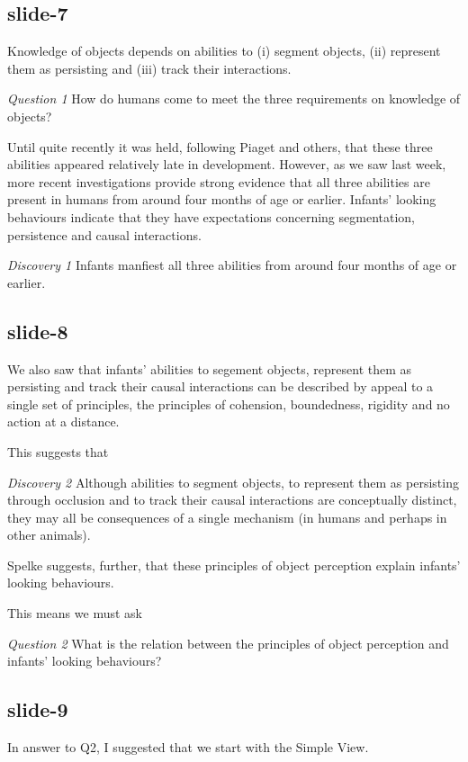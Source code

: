 \documentclass[12pt,\papersize]{extarticle}
\begin{document}
\subsection{slide-7}
Knowledge of objects depends on abilities to (i) segment objects, (ii) represent them as 
persisting and (iii) track their interactions.
 
\emph{Question 1}  How do humans come to meet the three requirements on knowledge of objects?
 
Until quite recently it was held, following Piaget and others, that these three abilities 
appeared relatively late in development.  
However, as we saw last week, more recent investigations provide strong evidence that all three 
abilities are present in humans from around four months of age or earlier.  
Infants' looking behaviours indicate that they have expectations concerning segmentation, 
persistence and causal interactions.
 
\emph{Discovery 1} Infants manfiest all three abilities from around four months of age or 
earlier.
 
\subsection{slide-8}
We also saw that infants' abilities to segement objects, represent them as persisting and track 
their causal interactions can be described by appeal to a single set of principles, 
the principles of cohension, boundedness, rigidity and no action at a distance.
 
This suggests that 
          
\emph{Discovery 2} Although abilities to segment objects, to represent them as persisting 
through occlusion and  to track their causal interactions are conceptually distinct, they 
may all be consequences of a single mechanism (in humans and perhaps in other animals).
          
 
Spelke suggests, further, that these principles of object perception explain infants' looking 
behaviours.
 
This means we must ask
          
\emph{Question 2} What is the relation between the principles of object perception and infants’ looking behaviours?
 
\subsection{slide-9}
In answer to Q2, I suggested that we start with the Simple View.
 
\end{document}
